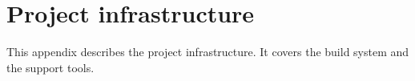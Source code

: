 \appendix

\chapter{Project infrastructure}\label{tm:app:project-infrastructure}

This appendix describes the project infrastructure. It covers the build system and the support tools.
